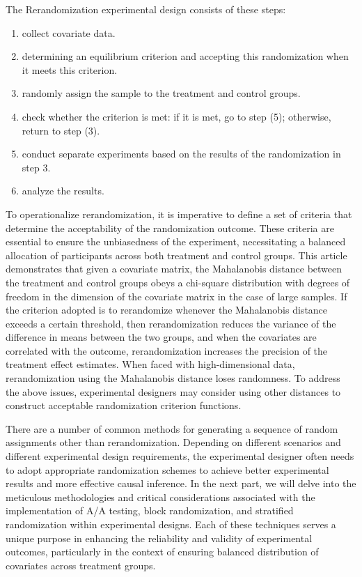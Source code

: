 \begin{digest}
The Rerandomization experimental design consists of these steps:
\begin{enumerate}
    \item collect covariate data.
    \item determining an equilibrium criterion and accepting this randomization when it meets this criterion.
    \item  randomly assign the sample to the treatment and control groups.
    \item check whether the criterion is met: if it is met, go to step (5); otherwise, return to step (3).
    \item conduct separate experiments based on the results of the randomization in step 3.
    \item  analyze the results.
\end{enumerate}

To operationalize rerandomization, it is imperative to define a set of criteria that determine the acceptability of the randomization outcome. These criteria are essential to ensure the unbiasedness of the experiment, necessitating a balanced allocation of participants across both treatment and control groups. This article demonstrates that given a covariate matrix, the Mahalanobis distance between the treatment and control groups obeys a chi-square distribution with degrees of freedom in the dimension of the covariate matrix in the case of large samples. If the criterion adopted is to rerandomize whenever the Mahalanobis distance exceeds a certain threshold, then rerandomization reduces the variance of the difference in means between the two groups, and when the covariates are correlated with the outcome, rerandomization increases the precision of the treatment effect estimates. When faced with high-dimensional data, rerandomization using the Mahalanobis distance loses randomness. To address the above issues, experimental designers may consider using other distances to construct acceptable randomization criterion functions.

There are a number of common methods for generating a sequence of random assignments other than rerandomization. Depending on different scenarios and different experimental design requirements, the experimental designer often needs to adopt appropriate randomization schemes to achieve better experimental results and more effective causal inference.
In the next part, we will delve into the meticulous methodologies and critical considerations associated with the implementation of A/A testing, block randomization, and stratified randomization within experimental designs. Each of these techniques serves a unique purpose in enhancing the reliability and validity of experimental outcomes, particularly in the context of ensuring balanced distribution of covariates across treatment groups.


\end{digest}
